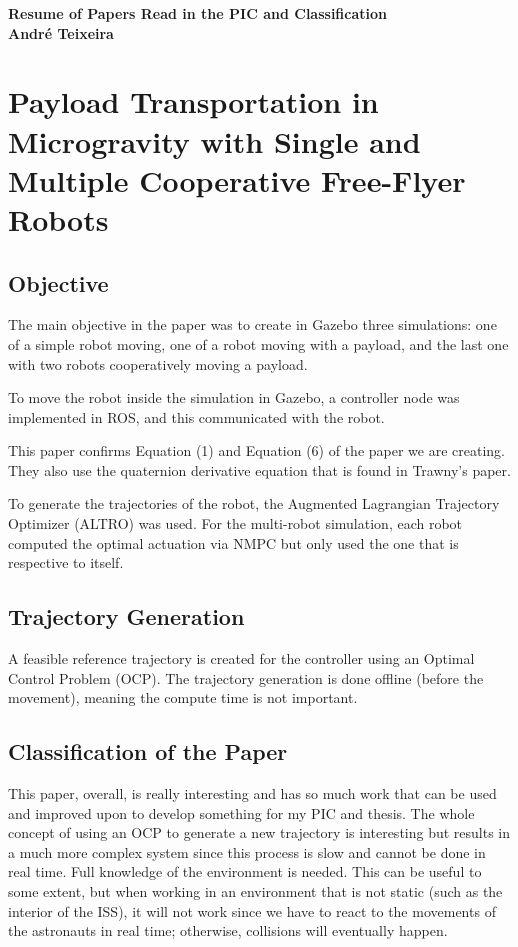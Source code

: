 \documentclass[a4paper,12pt]{article}
\begin{document}
\begin{titlepage}
    \centering
    \vspace*{1in}
    {\Huge \textbf{Resume of Papers Read in the PIC and Classification}} \\
    \vspace{1.5in}
    {\large \textbf{André Teixeira}} \\
    \vfill
\end{titlepage}

\tableofcontents

\clearpage

\section{Payload Transportation in Microgravity with Single and Multiple Cooperative Free-Flyer Robots}

    \subsection{Objective}
    The main objective in the paper was to create in Gazebo three simulations: one of a simple robot moving, one of a robot moving with a payload, and the last one with two robots cooperatively moving a payload.

    To move the robot inside the simulation in Gazebo, a controller node was implemented in ROS, and this communicated with the robot.

    This paper confirms Equation (1) and Equation (6) of the paper we are creating. They also use the quaternion derivative equation that is found in Trawny's paper.

    To generate the trajectories of the robot, the Augmented Lagrangian Trajectory Optimizer (ALTRO) was used. For the multi-robot simulation, each robot computed the optimal actuation via NMPC but only used the one that is respective to itself.

    \subsection{Trajectory Generation}
    A feasible reference trajectory is created for the controller using an Optimal Control Problem (OCP). The trajectory generation is done offline (before the movement), meaning the compute time is not important.
    
    \subsection{Classification of the Paper}
    This paper, overall, is really interesting and has so much work that can be used and improved upon to develop something for my PIC and thesis. The whole concept of using an OCP to generate a new trajectory is interesting but results in a much more complex system since this process is slow and cannot be done in real time. Full knowledge of the environment is needed. This can be useful to some extent, but when working in an environment that is not static (such as the interior of the ISS), it will not work since we have to react to the movements of the astronauts in real time; otherwise, collisions will eventually happen.
\end{document}
